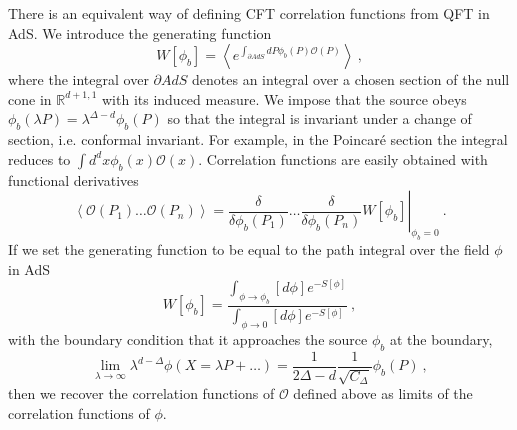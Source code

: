 \documentclass{ws-rv9x6}
\newcommand\be{\begin{equation}}
\newcommand\ee{\end{equation}}
\begin{document}
There is an equivalent way of defining CFT correlation functions from
QFT in AdS. We introduce the generating function 
\be
W\left[\phi_{b}\right]=\left\langle e^{\int_{\partial AdS}dP\phi_{b}(P)\mathcal{O}(P)}\right\rangle \ ,
\ee
where the integral over $\partial AdS$ denotes an integral over a
chosen section of the null cone in $\mathbb{R}^{d+1,1}$ with its
induced measure. We impose that the source obeys $\phi_{b}(\lambda P)=\lambda^{\Delta-d}\phi_{b}(P)$
so that the integral is invariant under a change of section, i.e.
conformal invariant. For example, in the Poincaré section the integral
reduces to $\int d^{d}x\phi_{b}(x)\mathcal{O}(x)$. Correlation functions
are easily obtained with functional derivatives
\be
\left\langle \mathcal{O}(P_{1})\dots\mathcal{O}(P_{n})\right\rangle =\left.\frac{\delta}{\delta\phi_{b}(P_{1})}\dots\frac{\delta}{\delta\phi_{b}(P_{n})}W\left[\phi_{b}\right]\right|_{\phi_{b}=0}\ .
\ee
If we set the generating function to be equal to the path integral
over the field $\phi$ in AdS 
\begin{equation}
W\left[\phi_{b}\right]=\frac{\int_{\phi\to\phi_{b}}\left[d\phi\right]e^{-S[\phi]}}{\int_{\phi\to0}\left[d\phi\right]e^{-S[\phi]}}\ ,\label{eq:AdSgeneratingfunctionW}
\end{equation}
with the boundary condition that it approaches the source $\phi_{b}$
at the boundary,
\begin{equation}
\lim_{\lambda\to\infty}\lambda^{d-\Delta}\phi(X=\lambda P+\dots)=\frac{1}{2\Delta-d}\frac{1}{\sqrt{C_{\Delta}}}\phi_{b}(P)\ ,\label{eq:AdSphiBC}
\end{equation}
then we recover the correlation functions of $\mathcal{O}$ defined
above as limits of the correlation functions of $\phi$. 
\end{document}
